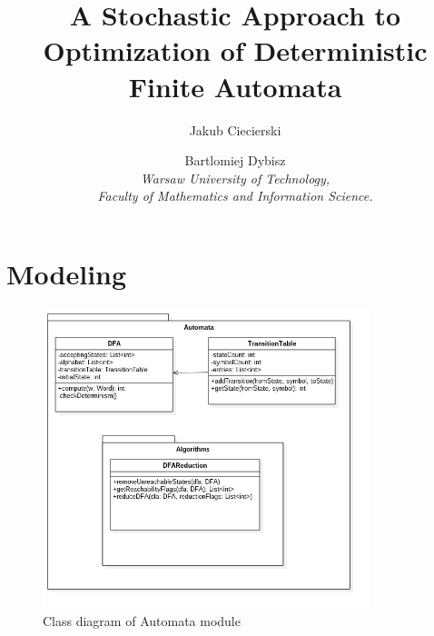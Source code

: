 \documentclass[runningheads, a4paper]{llncs}
\begin{document}
\mainmatter  %

\title{A Stochastic Approach to Optimization of Deterministic Finite Automata}


\author{Jakub Ciecierski \and Bartlomiej Dybisz \\ 
\textit{Warsaw University of Technology, \\
Faculty of Mathematics and Information Science.}}
%

\maketitle

\section{Modeling}

\begin{figure}[h]
\label{fig:class_automata}
\caption{Class diagram of Automata module}
    \includegraphics[width=0.85\textwidth]{res/uml/classes/automata.jpg}
\end{figure}
\end{document}
